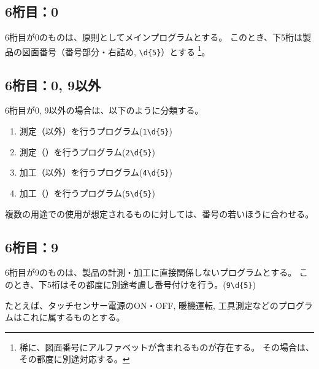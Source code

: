 \subsection{6桁目：0}
6桁目が0のものは、原則としてメインプログラムとする。
このとき、下5桁は製品の図面番号（番号部分・右詰め, \verb|\d{5}|）とする
\footnote{稀に、図面番号にアルファベットが含まれるものが存在する。
その場合は、その都度に別途対応する。}。

\subsection{6桁目：0, 9以外}
6桁目が0, 9以外の場合は、以下のように分類する。
\begin{enumerate}[label=\arabic*., ref=\arabic*, start=1]
\item\label{item:6Mmain} 測定（\dimple 以外）を行うプログラム(\verb|1\d{5}|)
\item\label{item:6MD} 測定（\dimple）を行うプログラム(\verb|2\d{5}|)
\setcounter{enumi}{3}
\item\label{item:6Kmain} 加工（\dimple 以外）を行うプログラム(\verb|4\d{5}|)
\item\label{item:6KD} 加工（\dimple）を行うプログラム(\verb|5\d{5}|)
\end{enumerate}
複数の用途での使用が想定されるものに対しては、番号の若いほうに合わせる。


\subsection{6桁目：9}
6桁目が9のものは、製品の計測・加工に直接関係しないプログラムとする。
このとき、下5桁はその都度に別途考慮し番号付けを行う。(\verb|9\d{5}|)
\begin{hosoku}
たとえば、タッチセンサー電源のON・OFF, 暖機運転, 工具測定などのプログラムはこれに属するものとする。
\end{hosoku}


